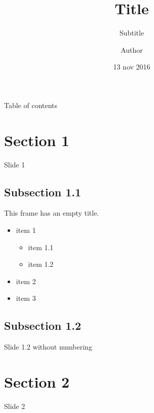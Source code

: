 \documentclass{beamer}
\title{Title}
\subtitle{Subtitle}
\author{Author}
\date{13 nov 2016}
\begin{document}
    \begin{frame}
        \maketitle
    \end{frame}
    
    \begin{frame}{Table of contents}
      \tableofcontents
    \end{frame}
    
    \section{Section 1}
    \begin{frame}{Slide 1}
        \lipsum[1]
    \end{frame}
    
    \subsection{Subsection 1.1}
    \begin{frame}
        This frame has an empty title.
        \vfill
        \begin{itemize}
            \item item 1
            \begin{itemize}
                \item item 1.1
                \item item 1.2
            \end{itemize}
            \item item 2
            \item item 3
        \end{itemize}
    \end{frame}
    
    \subsection{Subsection 1.2}
    
    { %
        \begin{frame}{Slide 1.2 without numbering}
            \lipsum[2]
        \end{frame}
        \addtocounter{page}{-1}
    }
    
    \section{Section 2}
    \begin{frame}{Slide 2}
        \lipsum[3]
    \end{frame}
\end{document}
